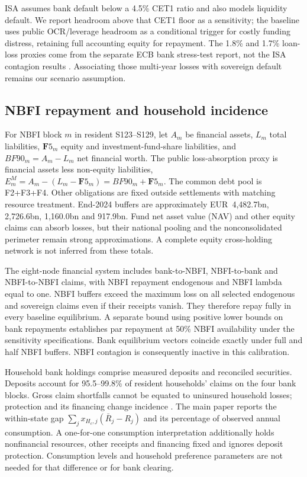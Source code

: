 ISA assumes bank default below a 4.5\% CET1 ratio and also models liquidity default. We report headroom above that CET1 floor as a sensitivity; the baseline uses public OCR/leverage headroom as a conditional trigger for costly funding distress, retaining full accounting equity for repayment. The 1.8\% and 1.7\% loan-loss proxies come from the separate ECB bank stress-test report, not the ISA contagion results \citep{ECBStress2025}. Associating those multi-year losses with sovereign default remains our scenario assumption.

\subsection{NBFI repayment and household incidence}

For NBFI block $m$ in resident S123--S129, let $A_m$ be financial assets, $L_m$ total liabilities, $\mathbf{F}5_m$ equity and investment-fund-share liabilities, and $BF90_m=A_m-L_m$ net financial worth. The public loss-absorption proxy is financial assets less non-equity liabilities, $E_m^M=A_m-(L_m-\mathbf{F}5_m)=BF90_m+\mathbf{F}5_m$. The common debt pool is F2+F3+F4. Other obligations are fixed outside settlements with matching resource treatment. End-2024 buffers are approximately EUR~4,482.7bn, 2,726.6bn, 1,160.0bn and 917.9bn. Fund net asset value (NAV) and other equity claims can absorb losses, but their national pooling and the nonconsolidated perimeter remain strong approximations. A complete equity cross-holding network is not inferred from these totals.

The eight-node financial system includes bank-to-NBFI, NBFI-to-bank and NBFI-to-NBFI claims, with NBFI repayment endogenous and NBFI lambda equal to one. NBFI buffers exceed the maximum loss on all selected endogenous and sovereign claims even if their receipts vanish. They therefore repay fully in every baseline equilibrium. A separate bound using positive lower bounds on bank repayments establishes par repayment at 50\% NBFI availability under the sensitivity specifications. Bank equilibrium vectors coincide exactly under full and half NBFI buffers. NBFI contagion is consequently inactive in this calibration.

Household bank holdings comprise measured deposits and reconciled securities. Deposits account for 95.5--99.8\% of resident households' claims on the four bank blocks. Gross claim shortfalls cannot be equated to uninsured household losses; protection and its financing change incidence \citep{EBADGS}. The main paper reports the within-state gap $\sum_j x_{H_c,j}(\bar R_j-R_j)$ and its percentage of observed annual consumption. A one-for-one consumption interpretation additionally holds nonfinancial resources, other receipts and financing fixed and ignores deposit protection. Consumption levels and household preference parameters are not needed for that difference or for bank clearing.

